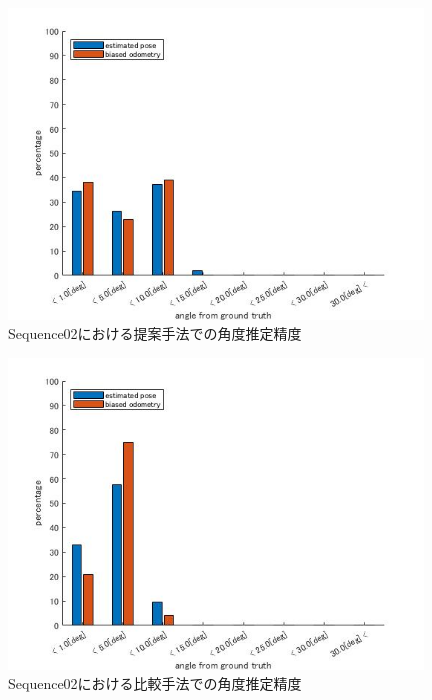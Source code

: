 \begin{figure}[htbp]
  \begin{minipage}{1.0\hsize}
  \begin{center}
   \includegraphics[width=110mm]{./picture/mesh_s2_rpy.jpg}
  \end{center}
  \caption{Sequence02における提案手法での角度推定精度}
  \label{fig:mesh_sequence02_RPY}
 \end{minipage}
\end{figure}

\begin{figure}[htbp]
 \begin{minipage}{1.0\hsize}
  \begin{center}
   \includegraphics[width=110mm]{./picture/point_s2_rpy.jpg}
  \end{center}
  \caption{Sequence02における比較手法での角度推定精度}
  \label{fig:point_sequence02_RPY}
 \end{minipage}
\end{figure}

